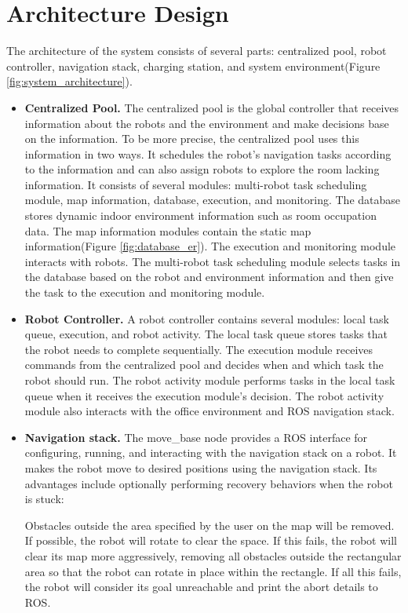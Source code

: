 \section{Architecture Design}
\label{sec:architecture_design}

The architecture of the system consists of several parts: centralized pool, robot controller, navigation stack, charging station, and system environment(Figure \ref{fig:system_architecture}). 

\begin{itemize}
 \item \textbf{Centralized Pool.} The centralized pool is the global controller that receives information about the robots and the environment and make decisions base on the information. To be more precise, the centralized pool uses this information in two ways. It schedules the robot's navigation tasks according to the information and can also assign robots to explore the room lacking information. It consists of several modules: multi-robot task scheduling module, map information, database, execution, and monitoring. The database stores dynamic indoor environment information such as room occupation data. The map information modules contain the static map information(Figure \ref{fig:database_er}). The execution and monitoring module interacts with robots. The multi-robot task scheduling module selects tasks in the database based on the robot and environment information and then give the task to the execution and monitoring module.

 \item \textbf{Robot Controller.} A robot controller contains several modules: local task queue, execution, and robot activity. The local task queue stores tasks that the robot needs to complete sequentially. The execution module receives commands from the centralized pool and decides when and which task the robot should run. The robot activity module performs tasks in the local task queue when it receives the execution module's decision. The robot activity module also interacts with the office environment and ROS navigation stack. 

 \item \textbf{Navigation stack.} The move\_base node provides a ROS interface for configuring, running, and interacting with the navigation stack on a robot. It makes the robot move to desired positions using the navigation stack. Its advantages include optionally performing recovery behaviors when the robot is stuck:

Obstacles outside the area specified by the user on the map will be removed.
If possible, the robot will rotate to clear the space.
If this fails, the robot will clear its map more aggressively, removing all obstacles outside the rectangular area so that the robot can rotate in place within the rectangle.
If all this fails, the robot will consider its goal unreachable and print the abort details to ROS\cite{MOVEBASE}.
\end{itemize} 

